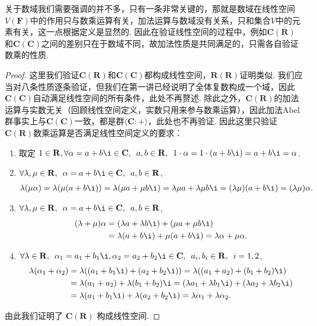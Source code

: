 关于数域我们需要强调的并不多，只有一条非常关键的，那就是数域在线性空间$V(\mathbf{F})$中的作用只与数乘运算有关，加法运算与数域没有关系，只和集合$V$中的元素有关，这一点根据定义是显然的. 因此在验证线性空间的过程中，例如$\mathbf{C}(\mathbf{R})$和$\mathbf{C}(\mathbf{C})$之间的差别只在于数域不同，故加法性质是共同满足的，只需各自验证数乘的性质.

\begin{proof}
    这里我们验证$\mathbf{C}(\mathbf{R})$和$\mathbf{C}(\mathbf{C})$都构成线性空间，$\mathbf{R(R)}$证明类似. 我们应当对八条性质逐条验证，但我们在第一讲已经说明了全体复数构成一个域，因此$\mathbf{C}(\mathbf{C})$自动满足线性空间的所有条件，此处不再赘述. 除此之外，$\mathbf{C}(\mathbf{R})$的加法运算与实数无关（回顾线性空间定义，实数只用来参与数乘运算），因此加法Abel群事实上与$\mathbf{C}(\mathbf{C})$一致，都是群$\langle \mathbf{C}\colon+\rangle$，此处也不再验证. 因此这里只验证$\mathbf{C}(\mathbf{R})$数乘运算是否满足线性空间定义的要求：
    \begin{enumerate}
        \item 取定 $1 \in \mathbf{R}, \forall \alpha = a+b\i \in \mathbf{C},\enspace a, b \in \mathbf{R},\enspace 1 \cdot \alpha = 1 \cdot (a+b\i) = a+b\i = \alpha$.

        \item $\forall \lambda, \mu \in \mathbf{R},\enspace \alpha = a+b\i \in \mathbf{C},\enspace a, b \in \mathbf{R}$,
              \begin{align*}
                  \lambda(\mu \alpha) = \lambda(\mu (a+b\i)) = \lambda(\mu a+\mu b\i) = \lambda \mu a + \lambda \mu b\i = (\lambda \mu)(a+b\i) = (\lambda \mu)\alpha.
              \end{align*}

        \item $\forall \lambda, \mu \in \mathbf{R},\enspace \alpha = a+b\i \in \mathbf{C},\enspace a, b \in \mathbf{R}$,
              \begin{align*}
                  (\lambda + \mu) \alpha
                   & = (\lambda a + \lambda b\i) + (\mu a + \mu b\i)            \\
                   & = \lambda(a+b\i)+\mu(a+b\i) = \lambda \alpha + \mu \alpha.
              \end{align*}

        \item $\forall \lambda \in \mathbf{R},\enspace \alpha_1 = a_1+b_1\i, \alpha_2 = a_2+b_2\i \in \mathbf{C},\enspace a_i, b_i \in \mathbf{R},\enspace i = 1, 2$,
              \begin{align*}
                  \lambda(\alpha_1+\alpha_2)
                   & = \lambda((a_1+b_1\i)+(a_2+b_2\i)) = \lambda((a_1+a_2)+(b_1+b_2)\i)                             \\
                   & = \lambda(a_1+a_2)+\lambda(b_1+b_2)\i = (\lambda a_1+\lambda b_1\i)+(\lambda a_2+\lambda b_2\i) \\
                   & = \lambda(a_1+b_1\i)+\lambda(a_2+b_2\i) = \lambda \alpha_1 + \lambda \alpha_2.
              \end{align*}
    \end{enumerate}
    由此我们证明了 $\mathbf{C}(\mathbf{R})$ 构成线性空间.


\end{proof}
